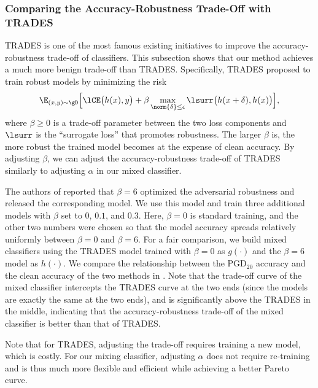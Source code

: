 \documentclass[11pt, letterpaper]{article}
\theoremstyle{plain}
\theoremstyle{definition}
\begin{document}
\subsubsection{Comparing the Accuracy-Robustness Trade-Off with TRADES} \label{sec:compare_with_trades}

TRADES \citep{Zhang19} is one of the most famous existing initiatives to improve the accuracy-robustness trade-off of classifiers. This subsection shows that our method achieves a much more benign trade-off than TRADES. Specifically, TRADES proposed to train robust models by minimizing the risk
\begin{equation*}
	\E_{(x, y) \sim \gD} \Big[ \lCE \big( h (x), y \big) + \beta \max_{\norm{\delta} \leq \epsilon} \lsurr \big( h (x+\delta), h (x) \big) \Big],
\end{equation*}
where $\beta \geq 0$ is a trade-off parameter between the two loss components and $\lsurr$ is the ``surrogate loss'' that promotes robustness. The larger $\beta$ is, the more robust the trained model becomes at the expense of clean accuracy. By adjusting $\beta$, we can adjust the accuracy-robustness trade-off of TRADES similarly to adjusting $\alpha$ in our mixed classifier.

The authors of \citep{Zhang19} reported that $\beta = 6$ optimized the adversarial robustness and released the corresponding model. We use this model and train three additional models with $\beta$ set to $0$, $0.1$, and $0.3$. Here, $\beta = 0$ is standard training, and the other two numbers were chosen so that the model accuracy spreads relatively uniformly between $\beta = 0$ and $\beta = 6$. For a fair comparison, we build mixed classifiers using the TRADES model trained with $\beta = 0$ as $g (\cdot)$ and the $\beta = 6$ model as $h (\cdot)$. We compare the relationship between the PGD$_{20}$ accuracy and the clean accuracy of the two methods in . Note that the trade-off curve of the mixed classifier intercepts the TRADES curve at the two ends (since the models are exactly the same at the two ends), and is significantly above the TRADES in the middle, indicating that the accuracy-robustness trade-off of the mixed classifier is better than that of TRADES.

Note that for TRADES, adjusting the trade-off requires training a new model, which is costly. For our mixing classifier, adjusting $\alpha$ does not require re-training and is thus much more flexible and efficient while achieving a better Pareto curve.
\end{document}
